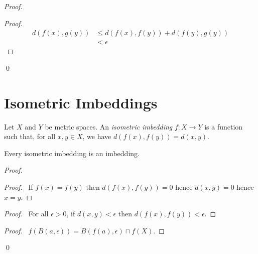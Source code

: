 \begin{proof}
    \pf
    \begin{proof}
        \pf
        \begin{align*}
            d(f(x),g(y)) & \leq d(f(x),f(y)) + d(f(y),g(y)) \\
            & < \epsilon
        \end{align*}
    \end{proof}
    \qed
\end{proof}

\section{Isometric Imbeddings}

\begin{definition}
    Let $X$ and $Y$ be metric spaces. An \emph{isometric imbedding} $f : X \rightarrow Y$ is a function such that, for all $x, y \in X$, we have $d(f(x),f(y)) = d(x,y)$.
\end{definition}

\begin{proposition}
    \label{proposition:isometric_imbedding}
    Every isometric imbedding is an imbedding.
\end{proposition}

\begin{proof}
    \pf
    \begin{proof}
        \pf\ If $f(x) = f(y)$ then $d(f(x),f(y)) = 0$ hence $d(x,y) = 0$ hence $x = y$.
    \end{proof}
    \begin{proof}
        \pf\ For all $\epsilon > 0$, if $d(x,y) < \epsilon$ then $d(f(x),f(y)) < \epsilon$.
    \end{proof}
    \begin{proof}
        \pf\ $f(B(a,\epsilon)) = B(f(a),\epsilon) \cap f(X)$.
    \end{proof}
    \qed
\end{proof}

